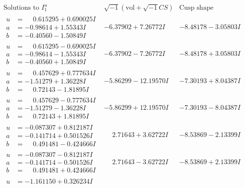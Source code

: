 \documentclass[1p]{elsarticle_modified}
\theoremstyle{definition}
\newcommand{\I}{\sqrt{-1}}
\begin{document}
$$\begin{array}{c|c|c}  
\text{Solutions to }I^u_{1}& \I (\text{vol} + \sqrt{-1}CS) & \text{Cusp shape}\\
 \hline 
\begin{aligned}
u &= \phantom{-}0.615295 + 0.690025 I \\
a &= -0.98614 + 1.55343 I \\
b &= -0.40560 - 1.50849 I\end{aligned}
 & -6.37902 + 7.26772 I & -8.48178 - 3.05803 I \\ \hline\begin{aligned}
u &= \phantom{-}0.615295 - 0.690025 I \\
a &= -0.98614 - 1.55343 I \\
b &= -0.40560 + 1.50849 I\end{aligned}
 & -6.37902 - 7.26772 I & -8.48178 + 3.05803 I \\ \hline\begin{aligned}
u &= \phantom{-}0.457629 + 0.777634 I \\
a &= -1.51279 + 1.36228 I \\
b &= \phantom{-}0.72143 - 1.81895 I\end{aligned}
 & -5.86299 - 12.19570 I & -7.30193 + 8.04387 I \\ \hline\begin{aligned}
u &= \phantom{-}0.457629 - 0.777634 I \\
a &= -1.51279 - 1.36228 I \\
b &= \phantom{-}0.72143 + 1.81895 I\end{aligned}
 & -5.86299 + 12.19570 I & -7.30193 - 8.04387 I \\ \hline\begin{aligned}
u &= -0.087307 + 0.812187 I \\
a &= -0.141714 + 0.501526 I \\
b &= \phantom{-}0.491481 - 0.424666 I\end{aligned}
 & \phantom{-}2.71643 + 3.62722 I & -8.53869 - 2.13399 I \\ \hline\begin{aligned}
u &= -0.087307 - 0.812187 I \\
a &= -0.141714 - 0.501526 I \\
b &= \phantom{-}0.491481 + 0.424666 I\end{aligned}
 & \phantom{-}2.71643 - 3.62722 I & -8.53869 + 2.13399 I \\ \hline\begin{aligned}
u &= -1.161150 + 0.326234 I \\

\end{aligned}
\end{array}$$
\end{document}
